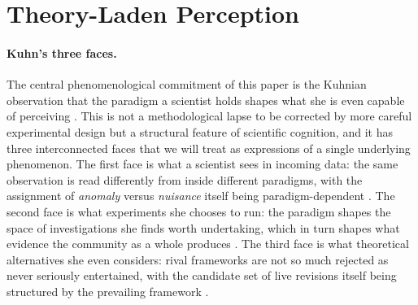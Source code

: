 
\section{Theory-Laden Perception}
\label{sec:theoryladen}

\paragraph{Kuhn's three faces.}
The central phenomenological commitment of this paper is the
Kuhnian observation that the paradigm a scientist holds shapes what
she is even capable of perceiving \citep{kuhn1962Structure}. This is
not a methodological lapse to be corrected by more careful
experimental design but a structural feature of scientific cognition,
and it has three interconnected faces that we will treat as
expressions of a single underlying phenomenon. The first face is
what a scientist sees in incoming data: the same observation is read
differently from inside different paradigms, with the assignment of
\emph{anomaly} versus \emph{nuisance} itself being paradigm-dependent
\citep{Brewer2010_14, Shimony1976_10}. The second face is what
experiments she chooses to run: the paradigm shapes the space of
investigations she finds worth undertaking, which in turn shapes
what evidence the community as a whole produces
\citep{Halloun2016_8}. The third face is what theoretical
alternatives she even considers: rival frameworks are not so much
rejected as never seriously entertained, with the candidate set of
live revisions itself being structured by the prevailing framework
\citep{Carrier2002_4, Malone1993_5}.

